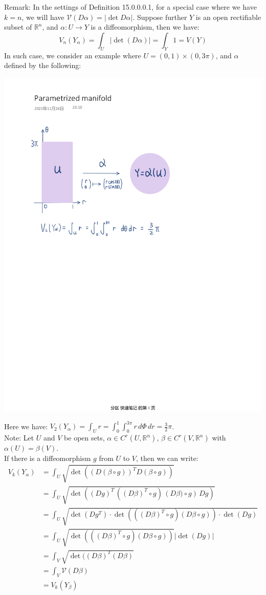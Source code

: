 \documentclass[11pt,oneside]{book}
\theoremstyle{break}
\theoremstyle{break}
\newcommand{\R}{\mathbb{R}}
\newcommand{\note}{\color{red}Note: \color{black}}
\newcommand{\remark}{\color{blue}Remark: \color{black}}
\begin{document}
\remark In the settings of Definition 15.0.0.0.1, for a special case where we have $k=n$, we will have $\mathcal{V}(D\alpha) = |\det D\alpha|$. Suppose further $Y$ is an open rectifiable subset of $\R^n$, and $\alpha:U \to Y$ is a diffeomorphism, then we have: 
$$V_n(Y_\alpha) = \int_U|\det (D\alpha)| = \int_Y 1 = V(Y)$$
In such case, we consider an example where $U = (0,1) \times (0,3\pi)$, and $\alpha$ defined by the following:
\begin{center}
\includegraphics[scale=0.8]{par-manifold.pdf}
\end{center}
Here we have: $V_2(Y_\alpha) = \int_U r = \int_0^1 \int_0^{3\pi} r\, d\Phi \, dr = \frac{3}{2}\pi$.\\

\note Let $U$ and $V$ be open sets, $\alpha \in C^r(U,\R^n)$, $\beta\in C^r(V,\R^n)$ with $\alpha(U) = \beta(V)$. \\
If there is a diffeomorphism $g$ from $U$ to $V$, then we can write:
\begin{align*}
V_k(Y_\alpha) &= \int_U \sqrt{\det((D(\beta\circ g))^TD(\beta \circ g))} \\
&= \int_U \sqrt{\det\left((Dg)^T \, \left((D\beta)^T\circ g\right) \, \left(D\beta)\circ g\right)\, Dg\right)}\\
&= \int_U \sqrt{\det(Dg^T) \cdot \det(((D\beta)^T\circ g)(D\beta\circ g))\cdot \det (Dg)}\\
&= \int_U \sqrt{\det(((D\beta)^T\circ g)(D\beta\circ g))} |\det(Dg)|\\
&= \int_V \sqrt{\det((D\beta)^T(D\beta)}\\
&= \int_V \mathcal{V}(D\beta)\\
&= V_k(Y_\beta)
\end{align*}
\end{document}
